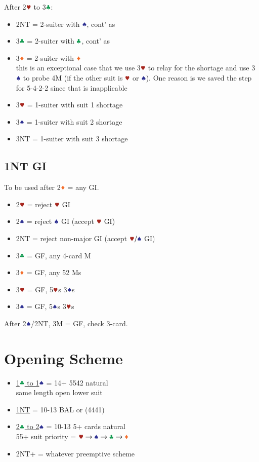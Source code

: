 \documentclass{article}
\begin{document}
\begin{multicols}{2}
\begin{CJK*}{UTF8}{gt}
\noindent After 2$\hhh$ to 3$\ccc$:
\begin{itemize}
    \item 2NT = 2-suiter with $\sss$, cont' as 
    \item 3$\ccc$ = 2-suiter with $\ccc$, cont' as 
    \item 3$\ddd$ = 2-suiter with $\ddd$ \\
        this is an exceptional case that we use 3$\hhh$ to relay for the shortage and use 3$\sss$ to probe 4M (if the other suit is $\hhh$ or $\sss$). One reason is we saved the step for 5-4-2-2 since that is inapplicable
    \item 3$\hhh$ = 1-suiter with suit 1 shortage
    \item 3$\sss$ = 1-suiter with suit 2 shortage
    \item 3NT = 1-suiter with suit 3 shortage
\end{itemize}

\subsection{1NT GI}\label{sec:1n-gi}
To be used after 2$\ddd$ = any GI.

\begin{itemize}
    \item 2$\hhh$ = reject $\hhh$ GI
    \item 2$\sss$ = reject $\sss$ GI (accept $\hhh$ GI)
    \item 2NT = reject non-major GI (accept $\hhh/\sss$ GI)
    \item 3$\ccc$ = GF, any 4-card M
    \item 3$\ddd$ = GF, any 52 Ms
    \item 3$\hhh$ = GF, 5$\hhh$s 3$\sss$s
    \item 3$\sss$ = GF, 5$\sss$s 3$\hhh$s
\end{itemize}

\noindent After 2$\sss$/2NT, 3M = GF, check 3-card.

\section{Opening Scheme}
\begin{itemize}
    \item \hyperref[sec:strong-1]{1$\ccc$ to 1$\sss$} = 14+ 5542 natural \\
    same length open lower suit
    \item \hyperref[sec:1n]{1NT} = 10-13 BAL or (4441)
    \item \hyperref[sec:intermediate-2]{2$\ccc$ to 2$\sss$} = 10-13 5+ cards natural \\
        55+ suit priority = $\hscd$
    \item 2NT+ = whatever preemptive scheme
\end{itemize}


\end{CJK*}
\end{multicols}
\end{document}
